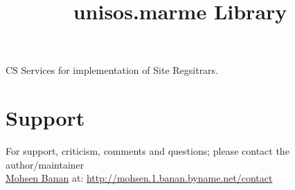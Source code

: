\documentclass{article}
\begin{document}

\begin{comment}
*  [[elisp:(org-cycle)][| ]]  *DBLK: front-begin*                                       :: [[elisp:(beginning-of-buffer)][Top]] [[elisp:(delete-other-windows)][(1)]]  [[elisp:(org-cycle)][| ]]
\end{comment}


\begin{comment}
*  [[elisp:(org-cycle)][| ]]  *DBLK: copyright*                                       :: [[elisp:(beginning-of-buffer)][Top]] [[elisp:(delete-other-windows)][(1)]]  [[elisp:(org-cycle)][| ]]
\end{comment}


\begin{comment}
*  [[elisp:(org-cycle)][| ]]  *DBLK: front-end*                                       :: [[elisp:(beginning-of-buffer)][Top]] [[elisp:(delete-other-windows)][(1)]]  [[elisp:(org-cycle)][| ]]
\end{comment}


\begin{comment}
*  [[elisp:(org-cycle)][| ]]  *DBLK: main-begin*                                       :: [[elisp:(beginning-of-buffer)][Top]] [[elisp:(delete-other-windows)][(1)]]  [[elisp:(org-cycle)][| ]]
\end{comment}

\title{unisos.marme Library}


\thispagestyle{empty}


\bigskip

CS Services for implementation of Site Regsitrars.

\section{Support}

For support, criticism, comments and questions; please contact the 
author/maintainer \\
\href{http://mohsen.1.banan.byname.net}{Mohsen Banan} at: \url{http://mohsen.1.banan.byname.net/contact}
\end{document}
